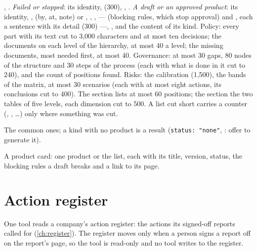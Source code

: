 \begin{description}[style=multiline, leftmargin=19mm, labelwidth=17mm, labelsep=2mm,
  font=\sffamily\bfseries\footnotesize\color{ink}, itemsep=1pt, topsep=2pt, before=\raggedright]
    , . \emph{Failed or stopped}: its identity,  (300),
    , . \emph{A draft or an approved product}: its identity,
    ,  (by, at, note) or , ,
    ,  ---  (blocking rules, which stop approval) and
    , each a sentence with its detail (300) ---, , and the content
    of its kind. Policy: every part with its text cut to 3,000 characters and at most ten
    decisions; the documents on each level of the hierarchy, at most 40 a level; the missing
    documents, most needed first, at most 40. Governance: at most 30 gaps, 80 nodes of the
    structure and 30 steps of the process (each with what is done in it cut to 240), and the
    count of positions found. Risks: the calibration (1,500), the bands of the matrix, at most
    30 scenarios (each with at most eight actions, its conclusions cut to 400). The
     section lists at most 60 positions; the  section the two
    tables of five levels, each dimension cut to 500. A list cut short carries a counter
    (, , …) only where something was cut.
  \item[Errors] The common ones; a kind with no product is a result (\texttt{status: "none"}, : offer to generate it).
  \item[Console] A product card: one product or the list, each with its title, version,
    status, the blocking rules a draft breaks and a link to its page.
\end{description}


\section{Action register}\label{sec:tools:register}

One tool reads a company's action register: the actions its signed-off reports called for
(\cref{ch:register}). The register moves only when a person signs a report off on the report's
page, so the tool is read-only and no tool writes to the register.

